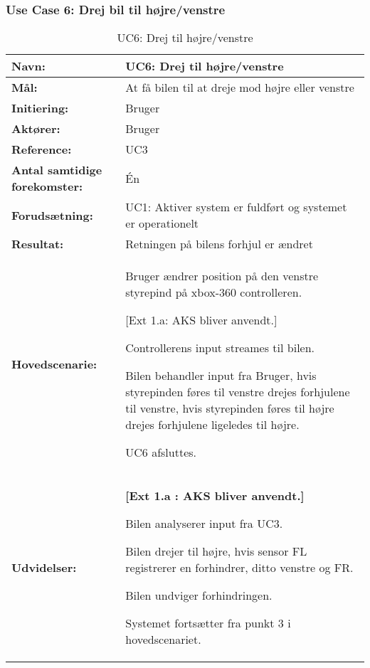 \subsubsection{Use Case 6: Drej bil til højre/venstre}
\begin{table}[h]
\begin{tabularx}{\textwidth}{| L{3.3 cm} | Z |} 													   \hline

\textbf{Navn:} 						& UC6: Drej til højre/venstre									\\ \hline
\textbf{Mål:}						& At få bilen til at dreje mod højre eller venstre				\\ \hline
\textbf{Initiering:}				& Bruger 														\\ \hline
\textbf{Aktører:} 					& Bruger	 													\\ \hline
\textbf{Reference:} 				& UC3 															\\ \hline
\textbf{Antal samtidige forekomster:} & Én 															\\ \hline
\textbf{Forudsætning:} 				& UC1: Aktiver system er fuldført og systemet er operationelt   \\ \hline
\textbf{Resultat:}					& Retningen på bilens forhjul er ændret 						\\ \hline
\textbf{Hovedscenarie:}				& 

\begin{packed_enum}
\item Bruger ændrer position på den venstre styrepind på xbox-360 controlleren.
	\begin{packed_item}\itemsep1pt \parskip0pt 
		\item {[}Ext 1.a: AKS bliver anvendt.{]}
	\end{packed_item}
	\item Controllerens input streames til bilen.
	\item Bilen behandler input fra Bruger, hvis styrepinden føres til venstre drejes forhjulene til venstre, hvis styrepinden føres til højre drejes forhjulene ligeledes til højre.
	\item UC6 afsluttes.
\end{packed_enum} \\ \hline
\textbf{Udvidelser:}				&  
\textbf{{[}Ext 1.a : AKS bliver anvendt.{]}}
	\begin{packed_enum}\itemsep1pt \parskip0pt 
		\item Bilen analyserer input fra UC3.
		\item Bilen drejer til højre, hvis sensor FL registrerer en forhindrer, ditto venstre og FR.
		\item Bilen undviger forhindringen. %
		\item Systemet fortsætter fra punkt 3 i hovedscenariet.
	\end{packed_enum}																				\\ \hline
\end{tabularx}
\caption{UC6: Drej til højre/venstre}
\label{tbl:UC6}
\end{table}